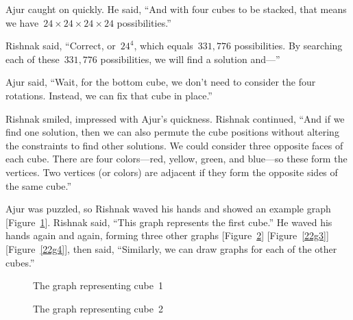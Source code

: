 Ajur caught on quickly. He said, ``And with four cubes to be stacked, that means we have~$24\times 24\times 24\times 24$ possibilities.''

Rishnak said, ``Correct, or~$24^4$, which equals~$331,776$ possibilities. By searching each of these~$331,776$ possibilities, we will find a solution and---''

Ajur said, ``Wait, for the bottom cube, we don't need to consider the four rotations. Instead, we can fix that cube in place.''

Rishnak smiled, impressed with Ajur's quickness. Rishnak continued, ``And if we find one solution, then we can also permute the cube positions without altering the constraints to find other solutions. We could consider three opposite faces of each cube. There are four colors---red, yellow, green, and blue---so these form the vertices. Two vertices (or colors) are adjacent if they form the opposite sides of the same cube.''

Ajur was puzzled, so Rishnak waved his hands and showed an example graph [Figure~\ref{22g1}]. Rishnak said, ``This graph represents the first cube.'' He waved his hands again and again, forming three other graphs [Figure~\ref{22g2}] [Figure~\ref{22g3}] [Figure~\ref{22g4}], then said, ``Similarly, we can draw graphs for each of the other cubes.''

\begin{figure}[h]
\begin{center}
\caption{The graph representing cube~1}\label{22g1}
\end{center}
\end{figure}

\begin{figure}[h]
\begin{center}
\caption{The graph representing cube~2}\label{22g2}
\end{center}
\end{figure}

